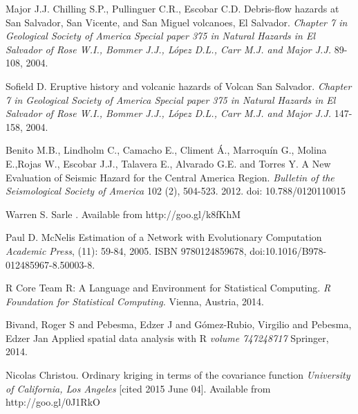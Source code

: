 \documentclass[11pt,twoside]{rmta2010eng}%
\begin{document}
\begin{thebibliography}{99}
Major J.J. Chilling S.P., Pullinguer C.R., Escobar C.D.
\newblock Debris-flow hazards at San Salvador, San Vicente, and San Miguel volcanoes, El Salvador.
\newblock \emph{Chapter 7 in Geological Society of America Special paper 375 in Natural Hazards in El Salvador of Rose W.I., Bommer J.J., L\'{o}pez D.L., Carr M.J. and Major J.J.}
 89-108, 2004.


Sofield D.
\newblock Eruptive history and volcanic hazards of Volcan San Salvador. 
\newblock \emph{Chapter 7 in Geological Society of America Special paper 375 in Natural Hazards in El Salvador of Rose W.I., Bommer J.J., L\'{o}pez D.L., Carr M.J. and Major J.J.}
 147-158, 2004.



Benito M.B., Lindholm C., Camacho E., Climent \'{A}., Marroqu\'{i}n G., Molina E.,Rojas W., Escobar J.J., Talavera E., Alvarado G.E. and Torres Y.
\newblock A New Evaluation of Seismic Hazard for the Central America Region. 
\newblock \emph{Bulletin of the Seismological Society of America}
 102 (2), 504-523. 2012.
\newblock  doi: 10.788/0120110015



Warren S. Sarle
. Available from http://goo.gl/k8fKhM



Paul D. McNelis
\newblock Estimation of a Network with Evolutionary Computation
\newblock \emph{Academic Press},
  (11): 59-84, 2005.
\newblock ISBN 9780124859678,
\newblock doi:10.1016/B978-012485967-8.50003-8.


R Core Team
\newblock R: A Language and Environment for Statistical Computing.
\newblock \emph{R Foundation for Statistical Computing.}
 Vienna, Austria, 2014.



Bivand, Roger S and Pebesma, Edzer J and G{\'o}mez-Rubio, Virgilio and Pebesma, Edzer Jan
\newblock Applied spatial data analysis with R
\newblock \emph{volume 747248717}
 Springer, 2014.



Nicolas Christou.
\newblock Ordinary kriging in terms of the covariance function
\newblock \emph{University of California, Los Angeles}
 [cited 2015 June 04]. Available from http://goo.gl/0J1RkO




\end{thebibliography}
\end{document}
